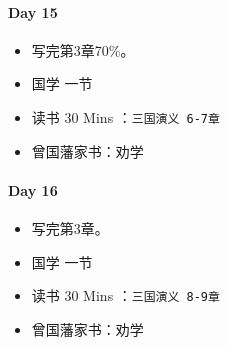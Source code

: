 \documentclass[UTF8,a4paper,8pt]{ctexart}
\begin{document}
 	 \paragraph{Day 15      \quad     }
		 \begin{itemize}[itemindent = 1em]
		 	\renewcommand\labelitemi{\makebox[0pt][l]{$\square$}\raisebox{.15ex}{\hspace{0.1em}$\checkmark$}}		
		 	
		 	\item    写完第3章70\%。
		 	
		 	
		 	\renewcommand\labelitemi{\makebox[0pt][l]{$\square$}\hspace{1em}}
		 	\item   国学  一节
		 	\item   读书  30 Mins	：\verb|三国演义 6-7章|
		 	\item   曾国藩家书：劝学
		 \end{itemize}
 	 \paragraph{Day 16      \quad     }
	 	 \begin{itemize}[itemindent = 1em]
	 	 	\renewcommand\labelitemi{\makebox[0pt][l]{$\square$}\raisebox{.15ex}{\hspace{0.1em}$\checkmark$}}		
	 	 	
	 	 	\item    写完第3章。
	 	 	
	 	 	
	 	 	\renewcommand\labelitemi{\makebox[0pt][l]{$\square$}\hspace{1em}}
	 	 	\item   国学  一节
	 	 	\item   读书  30 Mins	：\verb|三国演义 8-9章|
	 	 	\item   曾国藩家书：劝学
	 	 \end{itemize}
\end{document}
